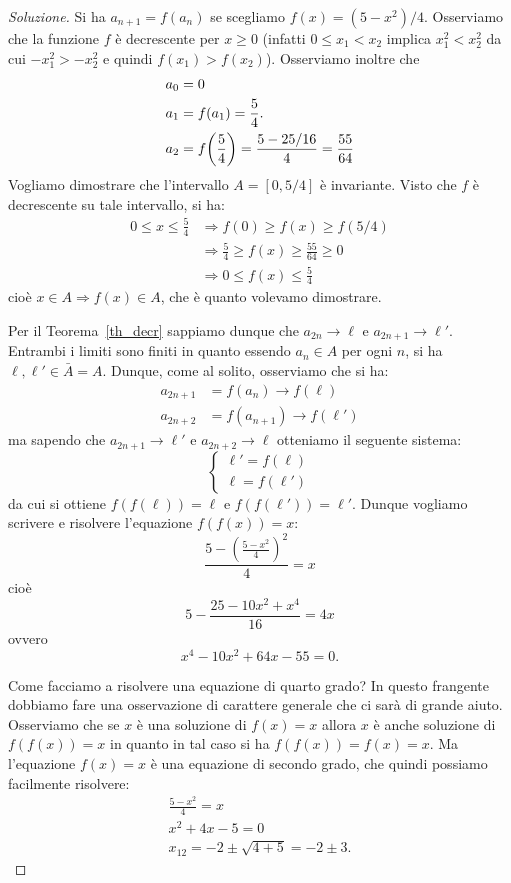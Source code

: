 \begin{proof}[Soluzione]
Si ha $a_{n+1} = f(a_n)$ se scegliamo $f(x) = (5-x^2)/4$. Osserviamo
che la funzione $f$ è decrescente per $x \ge 0$ (infatti $0 \le x_1 <
x_2$ implica $x_1^2 < x_2^2$ da cui $-x_1^2 > -x_2^2$ e quindi $f(x_1)
> f(x_2)$). Osserviamo inoltre che
\begin{align*}
a_0 &= 0\\
a_1 &= f(a_1) = \frac 5 4.\\
a_2 &= f{\left( \frac 5 4 \right)} = \frac{5-25/16}{4} = \frac{55}{64}
\end{align*}
Vogliamo dimostrare che l'intervallo $A=[0,5/4]$ è invariante. Visto
che $f$ è decrescente su tale intervallo, si ha:
\begin{align*}
0 \le x \le \frac 5 4 &\Rightarrow f(0) \ge f(x) \ge f(5/4)\\
&\Rightarrow \frac 5 4 \ge f(x) \ge \frac{55}{64} \ge 0\\
&\Rightarrow 0 \le f(x) \le \frac 5 4
\end{align*}
cioè $x\in A \Rightarrow f(x)\in A$, che è quanto volevamo dimostrare.

Per il Teorema~\ref{th_decr} sappiamo dunque che $a_{2n} \to \ell$ e
$a_{2n+1} \to \ell'$. Entrambi i limiti sono finiti in quanto essendo
$a_n \in A$ per ogni $n$, si ha $\ell, \ell' \in \bar A = A$.
Dunque, come al solito, osserviamo che si ha:
\begin{align*}
  a_{2n+1} &= f(a_n) \to f(\ell)  \\
  a_{2n+2} &= f(a_{n+1}) \to f(\ell')
\end{align*}
ma sapendo che $a_{2n+1}\to \ell'$ e $a_{2n+2}\to \ell$ otteniamo il
seguente sistema:
\[
\begin{cases}
  \ell' = f(\ell)\\
  \ell = f(\ell')
\end{cases}
\]
da cui si ottiene $f(f(\ell))=\ell$ e $f(f(\ell'))=\ell'$. Dunque
vogliamo scrivere e risolvere l'equazione $f(f(x))=x$:
\[
\frac{5-\left(\frac{5-x^2}{4}\right)^2}{4} = x
\]
cioè
\[
5 - \frac{25 - 10x^2 + x^4}{16} = 4x
\]
ovvero
\[
x^4 - 10 x^2 + 64 x - 55 = 0.
\]

Come facciamo a risolvere una equazione di quarto grado?
In questo frangente dobbiamo fare una osservazione di carattere
generale che ci sarà di grande aiuto.
Osserviamo che se $x$ è una soluzione di $f(x)=x$ allora $x$
è anche soluzione di $f(f(x)) = x$ in quanto in tal caso si ha
$f(f(x))=f(x)=x$.
Ma l'equazione $f(x) = x$ è una equazione di secondo grado, che quindi
possiamo facilmente risolvere:
\begin{gather*}
  \frac{5-x^2}{4} = x \\
  x^2 + 4x - 5 = 0 \\
  x_{12} = -2 \pm \sqrt{4 + 5} = -2 \pm 3.
\end{gather*}


\end{proof}
